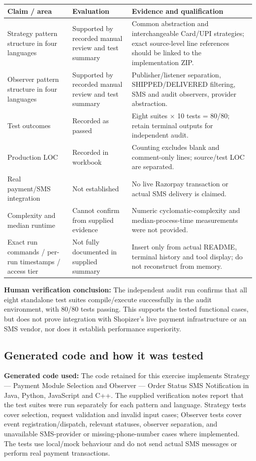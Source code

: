 \documentclass[11pt,a4paper]{article}
\newcommand{\tsmall}{\small\setlength{\tabcolsep}{3pt}}
\begin{document}
\begingroup\tsmall
\begin{longtable}{@{}P{3.6cm}P{3.6cm}P{8.9cm}@{}}
\toprule
\textbf{Claim / area} & \textbf{Evaluation} & \textbf{Evidence and qualification}\\
\midrule
\endhead
Strategy pattern structure in four languages & Supported by recorded manual review and test summary & Common abstraction and interchangeable Card/UPI strategies; exact source-level line references should be linked to the implementation ZIP.\\
Observer pattern structure in four languages & Supported by recorded manual review and test summary & Publisher/listener separation, SHIPPED/DELIVERED filtering, SMS and audit observers, provider abstraction.\\
Test outcomes & Recorded as passed & Eight suites $\times$ 10 tests = 80/80; retain terminal outputs for independent audit.\\
Production LOC & Recorded in workbook & Counting excludes blank and comment-only lines; source/test LOC are separated.\\
Real payment/SMS integration & Not established & No live Razorpay transaction or actual SMS delivery is claimed.\\
Complexity and median runtime & Cannot confirm from supplied evidence & Numeric cyclomatic-complexity and median-process-time measurements were not provided.\\
Exact run commands / per-run timestamps / access tier & Not fully documented in supplied summary & Insert only from actual README, terminal history and tool display; do not reconstruct from memory.\\
\bottomrule
\end{longtable}
\endgroup

\textbf{Human verification conclusion:} The independent audit run confirms that all eight standalone test suites compile/execute successfully in the audit environment, with 80/80 tests passing. This supports the tested functional cases, but does not prove integration with Shopizer's live payment infrastructure or an SMS vendor, nor does it establish performance superiority.

\subsection*{Generated code and how it was tested}

\textbf{Generated code used:} The code retained for this exercise implements Strategy --- Payment Module Selection and Observer --- Order Status SMS Notification in Java, Python, JavaScript and C++. The supplied verification notes report that the test suites were run separately for each pattern and language. Strategy tests cover selection, request validation and invalid input cases; Observer tests cover event registration/dispatch, relevant statuses, observer separation, and unavailable SMS-provider or missing-phone-number cases where implemented. The tests use local/mock behaviour and do not send actual SMS messages or perform real payment transactions.
\end{document}
